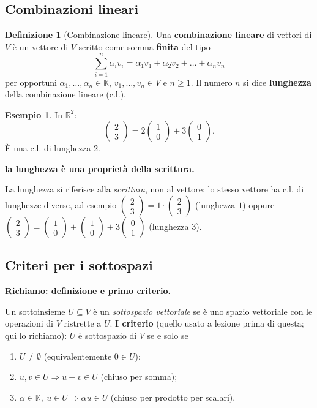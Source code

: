\documentclass[11pt,a4paper]{article}
\newcommand{\RR}{\mathbb{R}}
\newcommand{\KK}{\mathbb{K}}
\newcommand{\vect}[2]{\begin{pmatrix}#1\\#2\end{pmatrix}}
\theoremstyle{plain}
\theoremstyle{definition}
\newtheorem{defn}[prop]{Definizione}
\newtheorem{esempio}[prop]{Esempio}
\theoremstyle{remark}
\begin{document}
\subsection{Combinazioni lineari}

\begin{defn}[Combinazione lineare]
Una \textbf{combinazione lineare} di vettori di $V$ è un vettore di $V$ scritto come somma \textbf{finita} del tipo
\[
  \sum_{i=1}^{n}\alpha_iv_i =\alpha_1v_1+\alpha_2v_2+\dots+\alpha_nv_n
\]
per opportuni $\alpha_1,\dots,\alpha_n\in\KK$, $v_1,\dots,v_n\in V$ e $n\ge1$.
Il numero $n$ si dice \textbf{lunghezza} della combinazione lineare (c.l.).
\end{defn}

\begin{esempio}
In $\RR^2$:
\[
  \vect23=2\vect10+3\vect01 .
\]
È una c.l. di lunghezza $2$.
\end{esempio}

\par\medskip
\noindent\textbf{la lunghezza è una proprietà della scrittura.}\par

La lunghezza si riferisce alla \emph{scrittura}, non al vettore: lo stesso vettore ha c.l. di lunghezze diverse, ad esempio
$\vect23=1\cdot\vect23$ (lunghezza $1$) oppure $\vect23=\vect10+\vect10+3\vect01$ (lunghezza $3$).
\par\medskip

\subsection{Criteri per i sottospazi}

\par\medskip
\noindent\textbf{Richiamo: definizione e primo criterio.}\par

Un sottoinsieme $U\subseteq V$ è un \emph{sottospazio vettoriale} se è uno spazio vettoriale con le operazioni di $V$ ristrette a $U$.
\textbf{I criterio} (quello usato a lezione prima di questa; qui lo richiamo): $U$ è sottospazio di $V$ se e solo se
\begin{enumerate}[label=(\roman*),leftmargin=*]
  \item $U\ne\emptyset$ (equivalentemente $0\in U$);
  \item $u,v\in U\Rightarrow u+v\in U$ (chiuso per somma);
  \item $\alpha\in\KK,\ u\in U\Rightarrow\alpha u\in U$ (chiuso per prodotto per scalari).
\end{enumerate}
\par\medskip
\end{document}
